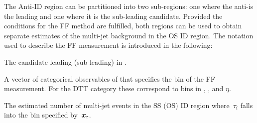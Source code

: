 {%
  \newcommand*{\ffargs}{\ensuremath{( \myvec{x}_{\tau} )}\xspace}

  \newcommand*{\NmjID}[2]{\ensuremath{N_\text{multi-jet}^{\text{#1, loose }\tau_{#2}}}\xspace}
  \newcommand*{\NmjIDIncl}[1]{\ensuremath{N_\text{multi-jet}^{\text{#1, ID}}}\xspace}

  \newcommand*{\NmjAntiIDIncl}[1]{\ensuremath{N_\text{multi-jet}^{\text{#1, Anti-ID}}}\xspace}
  \newcommand*{\NmjAntiID}[2]{\ensuremath{N_\text{multi-jet}^{\text{#1, anti-}\tau_{#2}}}\xspace}

  The Anti-ID region can be partitioned into two sub-regions: one where the
  anti-\tauhadvis is the leading and one where it is the sub-leading \tauhadvis
  candidate. Provided the conditions for the FF method are fulfilled, both
  regions can be used to obtain separate estimates of the multi-jet background
  in the OS ID region. The notation used to describe the FF measurement is
  introduced in the following:
  \begin{description}[style=standard]
  \item[$\tau_0$ ($\tau_1$)] The \tauhadvis candidate leading (sub-leading) in \pT.

  \item[$\myvec{x}_\tau$] A vector of categorical observables of \tauhadvis that
    specifies the bin of the FF measurement. For the DTT category these
    correspond to bins in \Ntracks, \pT, and $\eta$.

  \item[$\NmjID{SS(OS)}{i}\ffargs$] The estimated number of multi-jet events in
    the SS (OS) ID region where~$\tau_i$ falls into the bin specified
    by~$\myvec{x}_\tau$.


\end{description}}
